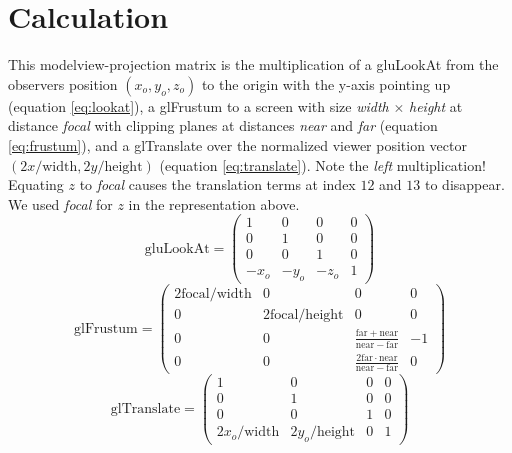 \documentclass{article}
\newcommand{\width}{\mathrm{width}}
\newcommand{\height}{\mathrm{height}}
\newcommand{\near}{\mathrm{near}}
\newcommand{\focal}{\mathrm{focal}}
\newcommand{\far}{\mathrm{far}}
\begin{document}
\section{Calculation}
This modelview-projection matrix is the multiplication of a gluLookAt from the observers position 
$(x_o, y_o, z_o)$ to the
origin with the y-axis pointing up (equation \ref{eq:lookat}), a glFrustum to a screen with size \textit{width}
$\times$ \textit{height} at distance \textit{focal} with clipping planes at distances \textit{near} and
\textit{far} (equation \ref{eq:frustum}), and a glTranslate over the normalized viewer position vector $(2x/\mathrm{width},
2y/\mathrm{height})$ (equation \ref{eq:translate}). Note the \textit{left} multiplication! Equating $z$ to \textit{focal}
causes the translation terms at index $12$ and $13$ to disappear. We used \textit{focal} for $z$ in the representation above.
\begin{equation}
\mathrm{gluLookAt}=\left(
\begin{array}{cccc}
  1 &  0 &  0 & 0 \\
  0 &  1 &  0 & 0 \\
  0 &  0 &  1 & 0 \\
 -x_o & -y_o & -z_o & 1
\end{array} 
\right)
\label{eq:lookat}
\end{equation}
\begin{equation}
\mathrm{glFrustum}=\left(
\begin{array}{cccc}
 2\focal/\width &               0 &                                  0 &     0 \\
              0 & 2\focal/\height &                                  0 &     0 \\
              0 &               0 &      \frac{\far+\near}{\near-\far} &    -1 \\
              0 &               0 & \frac{2\far\cdot\near}{\near-\far} &     0
\end{array} 
\right)
\label{eq:frustum}
\end{equation}
\begin{equation}
\mathrm{glTranslate}=\left(
\begin{array}{cccc}
 1 & 0 & 0 & 0 \\
 0 & 1 & 0 & 0 \\
 0 & 0 & 1 & 0 \\
 2x_o/\width & 2y_o/\height & 0 & 1
\end{array} 
\right)
\label{eq:translate}
\end{equation}
\end{document}
